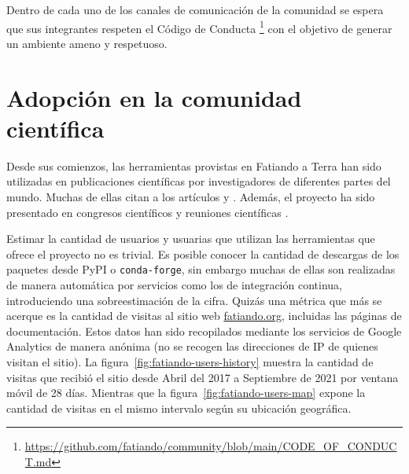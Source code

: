 Dentro de cada uno de los canales de comunicación de la comunidad se espera
que sus integrantes respeten el Código de
Conducta%
\footnote{%
    \url{https://github.com/fatiando/community/blob/main/CODE_OF_CONDUCT.md}%
}
con el objetivo de generar un ambiente ameno y respetuoso.



\section{Adopción en la comunidad científica}

Desde sus comienzos, las herramientas provistas en Fatiando a Terra han sido
utilizadas en publicaciones científicas por investigadores de diferentes partes
del mundo.
Muchas de ellas citan a los artículos \citet{uieda2013} y \citet{verde2018}.
Además, el proyecto ha sido presentado en congresos científicos y reuniones
científicas \citep{uieda2013,uieda2020b,soler2021c}.

Estimar la cantidad de usuarios y usuarias que utilizan las herramientas que
ofrece el proyecto no es trivial.
Es posible conocer la cantidad de descargas de los paquetes desde PyPI
o \texttt{conda-forge}, sin embargo muchas de ellas son realizadas de manera
automática por servicios como los de integración continua, introduciendo una
sobreestimación de la cifra.
Quizás una métrica que más se acerque es la cantidad de visitas al sitio web
\href{https://fatiando.org}{fatiando.org}, incluidas las páginas de
documentación.
Estos datos han sido recopilados mediante los servicios de Google Analytics de
manera anónima (no se recogen las direcciones de IP de quienes visitan el
sitio).
La figura~\ref{fig:fatiando-users-history} muestra la cantidad de visitas que
recibió el sitio desde Abril del 2017 a Septiembre de 2021 por ventana móvil de
28 días.
Mientras que la figura~\ref{fig:fatiando-users-map} expone la cantidad de
visitas en el mismo intervalo según su ubicación geográfica.


